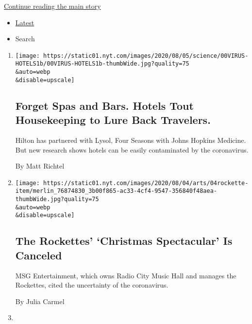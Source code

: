 \protect\hyperlink{after-mid1}{Continue reading the main story}

\begin{itemize}
\tightlist
\item
  \protect\hyperlink{stream-panel}{Latest}
\item
  Search
\end{itemize}

\begin{enumerate}
\def\labelenumi{\arabic{enumi}.}
\item
  \href{/2020/08/04/health/coronavirus-hotels-infect.html}{}

  \texttt{[image: https://static01.nyt.com/images/2020/08/05/science/00VIRUS-HOTELS1b/00VIRUS-HOTELS1b-thumbWide.jpg?quality=75\\\&auto=webp\\\&disable=upscale]}

  \hypertarget{forget-spas-and-bars-hotels-tout-housekeeping-to-lure-back-travelers}{%
  \subsection{Forget Spas and Bars. Hotels Tout Housekeeping to Lure
  Back
  Travelers.}\label{forget-spas-and-bars-hotels-tout-housekeeping-to-lure-back-travelers}}

  Hilton has partnered with Lysol, Four Seasons with Johns Hopkins
  Medicine. But new research shows hotels can be easily contaminated by
  the coronavirus.

  By Matt Richtel
\item
  \href{/2020/08/04/theater/radio-city-rockettes-christmas-canceled.html}{}

  \texttt{[image: https://static01.nyt.com/images/2020/08/04/arts/04rockette-item/merlin\_76874830\_3b00f865-ac33-4cf4-9547-356840f48aea-thumbWide.jpg?quality=75\\\&auto=webp\\\&disable=upscale]}

  \hypertarget{the-rockettes-christmas-spectacular-is-canceled}{%
  \subsection{The Rockettes' `Christmas Spectacular' Is
  Canceled}\label{the-rockettes-christmas-spectacular-is-canceled}}

  MSG Entertainment, which owns Radio City Music Hall and manages the
  Rockettes, cited the uncertainty of the coronavirus.

  By Julia Carmel
\item
  \href{/2020/08/04/dining/nyc-restaurant-news.html}{}


\end{enumerate}
